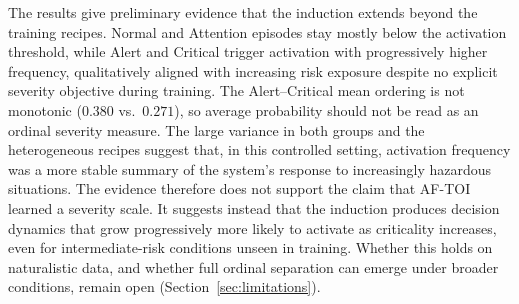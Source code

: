 \documentclass[a4paper,fleqn]{cas-dc}
\newcommand{\AFTOI}{\mbox{AF-TOI}\xspace}
\begin{document}
The results give preliminary evidence that the induction extends beyond the
training recipes. Normal and Attention episodes stay mostly below the activation
threshold, while Alert and Critical trigger activation with progressively higher
frequency, qualitatively aligned with increasing risk exposure despite no
explicit severity objective during training.
The Alert--Critical mean ordering is not monotonic ($0.380$ vs.\ $0.271$), so
average probability should not be read as an ordinal severity measure. The large
variance in both groups and the heterogeneous recipes suggest that, in this
controlled setting, activation frequency was a more stable summary of the
system's response to increasingly hazardous situations.
The evidence therefore does not support the claim that \AFTOI learned a severity
scale. It suggests instead that the induction produces decision dynamics that
grow progressively more likely to activate as criticality increases, even for
intermediate-risk conditions unseen in training. Whether this holds on
naturalistic data, and whether full ordinal separation can emerge under broader
conditions, remain open (Section~\ref{sec:limitations}).
\end{document}
